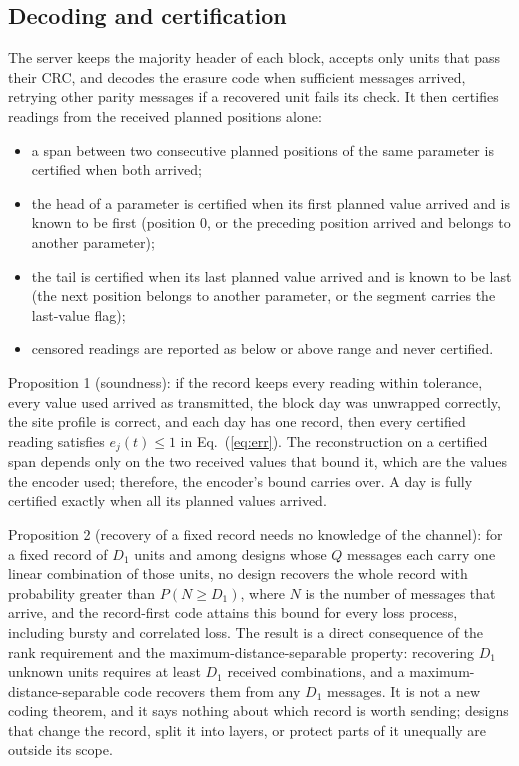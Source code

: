 \subsection{Decoding and certification}
\label{sec:cert}
The server keeps the majority header of each block, accepts only units that pass their CRC, and decodes the erasure code when sufficient messages arrived, retrying other parity messages if a recovered unit fails its check. It then certifies readings from the received planned positions alone:
\begin{itemize}
  \item a span between two consecutive planned positions of the same parameter is certified when both arrived;
  \item the head of a parameter is certified when its first planned value arrived and is known to be first (position 0, or the preceding position arrived and belongs to another parameter);
  \item the tail is certified when its last planned value arrived and is known to be last (the next position belongs to another parameter, or the segment carries the last-value flag);
  \item censored readings are reported as below or above range and never certified.
\end{itemize}

Proposition 1 (soundness): if the record keeps every reading within tolerance, every value used arrived as transmitted, the block day was unwrapped correctly, the site profile is correct, and each day has one record, then every certified reading satisfies $e_j(t) \le 1$ in Eq.~(\ref{eq:err}). The reconstruction on a certified span depends only on the two received values that bound it, which are the values the encoder used; therefore, the encoder's bound carries over. A day is fully certified exactly when all its planned values arrived.

Proposition 2 (recovery of a fixed record needs no knowledge of the channel): for a fixed record of $D_1$ units and among designs whose $Q$ messages each carry one linear combination of those units, no design recovers the whole record with probability greater than $P(N \ge D_1)$, where $N$ is the number of messages that arrive, and the record-first code attains this bound for every loss process, including bursty and correlated loss. The result is a direct consequence of the rank requirement and the maximum-distance-separable property: recovering $D_1$ unknown units requires at least $D_1$ received combinations, and a maximum-distance-separable code recovers them from any $D_1$ messages. It is not a new coding theorem, and it says nothing about which record is worth sending; designs that change the record, split it into layers, or protect parts of it unequally are outside its scope.


